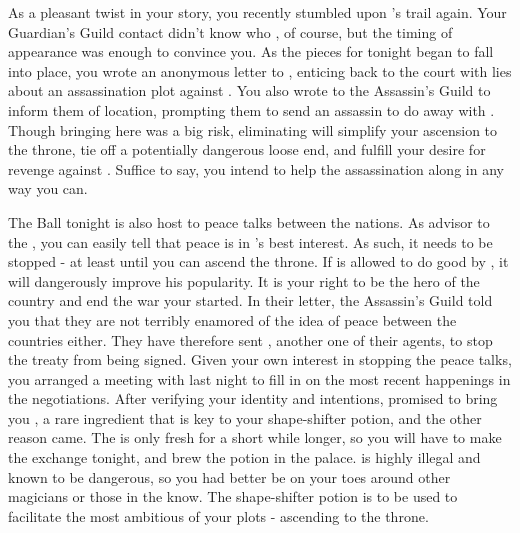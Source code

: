 \documentclass[char]{NeptuneBall}
\begin{document}
As a pleasant twist in your story, you recently stumbled upon \cQueen{}'s trail again. Your Guardian's Guild contact didn't know who \cQueen{\they} \cQueen{\were}, of course, but the timing of \cQueen{\their} appearance was enough to convince you. As the pieces for tonight began to fall into place, you wrote an anonymous letter to \cQueen{}, enticing \cQueen{\them} back to the court with lies about an assassination plot against \cKing{}. You also wrote to the Assassin's Guild to inform them of \cQueen{\their} location, prompting them to send an assassin to do away with \cQueen{}. Though bringing \cQueen{\them} here was a big risk, eliminating \cQueen{} will simplify your ascension to the throne, tie off a potentially dangerous loose end, and fulfill your desire for revenge against \cQueen{\them}. Suffice to say, you intend to help the assassination along in any way you can.

The Ball tonight is also host to peace talks between the nations. As advisor to the \cKing{\King}, you can easily tell that peace is in \pAtlantis{}'s best interest. As such, it needs to be stopped - at least until you can ascend the throne. If \cKing{} is allowed to do good by \pAtlantis{}, it will dangerously improve his popularity. It is your right to be the hero of the country and end the war your \cExExKing{\parent} started. In their letter, the Assassin's Guild told you that they are not terribly enamored of the idea of peace between the countries either. They have therefore sent \cSpy{}, another one of their agents, to stop the treaty from being signed. Given your own interest in stopping the peace talks, you arranged a meeting with \cSpy{\them} last night to fill \cSpy{\them} in on the most recent happenings in the negotiations. After verifying your identity and intentions, \cSpy{} promised to bring you \iHemlock{\MYname}, a rare ingredient that is key to your shape-shifter potion, and the other reason \cSpy{\they} came. The \iHemlock{\MYname} is only fresh for a short while longer, so you will have to make the exchange tonight, and brew the potion in the palace. \iHemlock{\MYname} is highly illegal and known to be dangerous, so you had better be on your toes around other magicians or those in the know. The shape-shifter potion is to be used to facilitate the most ambitious of your plots - ascending to the throne. 
\end{document}
